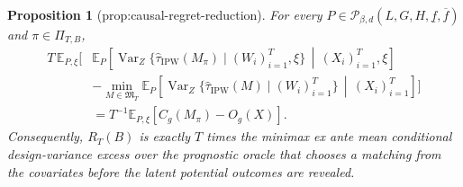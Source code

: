 \documentclass{article}
\newtheorem{proposition}{Proposition}
\begin{document}
\begin{proposition}[prop:causal-regret-reduction]\label{prop:causal-regret-reduction}
For every \(P\in\mathcal P_{\beta,d}(L,G,H,\underline f,\overline f)\) and \(\pi\in\Pi_{T,B}\),
\[
\begin{split}
T\,\mathbb E_{P,\xi}\!\Bigg[&\mathbb E_P\!\left[\operatorname{Var}_Z\{\widehat\tau_{\mathrm{IPW}}(M_\pi)\mid (W_i)_{i=1}^T,\xi\}\,\middle|\,(X_i)_{i=1}^T,\xi\right]\\
&-\min_{M\in\mathfrak M_T}\mathbb E_P\!\left[\operatorname{Var}_Z\{\widehat\tau_{\mathrm{IPW}}(M)\mid (W_i)_{i=1}^T\}\,\middle|\,(X_i)_{i=1}^T\right]\Bigg]\\
&=T^{-1}\mathbb E_{P,\xi}[C_g(M_\pi)-O_g(X)].
\end{split}
\]
Consequently, \(R_T(B)\) is exactly \(T\) times the minimax ex ante mean conditional design-variance excess over the prognostic oracle that chooses a matching from the covariates before the latent potential outcomes are revealed.
\end{proposition}
\end{document}
